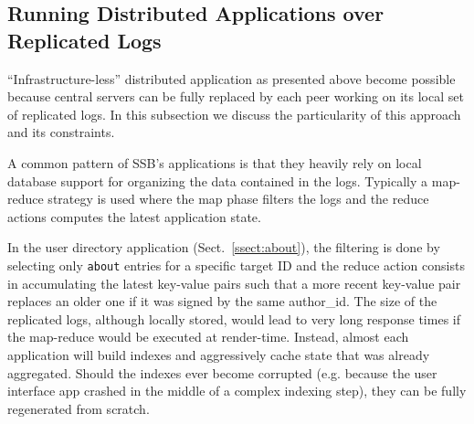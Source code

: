 \documentclass[9pt,sigconf,rewiew]{acmart}
\begin{document}


\subsection{Running Distributed Applications over Replicated Logs}
\label{ssect:dapps}

``Infrastructure-less'' distributed application as presented above
become possible because central servers can be fully replaced by each
peer working on its local set of replicated logs. In this subsection
we discuss the particularity of this approach and its constraints.

A common pattern of SSB's applications is that they heavily rely
on local database support for organizing the data contained in the logs.
Typically a map-reduce strategy is used where the map phase filters
the logs and the reduce actions computes the latest application state.

In the user directory application (Sect.~\ref{ssect:about}), the filtering is
done by selecting only {\tt about} entries for a specific target ID
and the reduce action consists in accumulating the latest key-value
pairs such that a more recent key-value pair replaces an older one if
it was signed by the same author\_id. The size of the replicated logs,
although locally stored, would lead to very long response times if the
map-reduce would be executed at render-time. Instead, almost each
application will build indexes and aggressively cache state that was
already aggregated. Should the indexes ever become corrupted
(e.g. because the user interface app crashed in the middle of a
complex indexing step), they can be fully regenerated from scratch.
\end{document}
